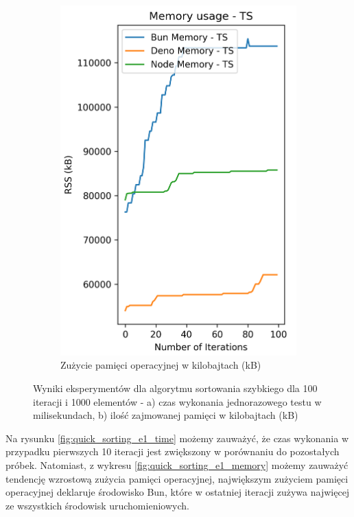 \begin{figure}[H]
\begin{subfigure}[b]{0.44\textwidth}
  \end{subfigure}
  \begin{subfigure}[b]{0.44\textwidth}
    \centering
    \includegraphics[width=\textwidth]{Figures/sorting/sorting_quick_100_1000_ts_memory.png}
    \caption{Zużycie pamięci operacyjnej w kilobajtach (kB)}
    \label{fig:quick_sorting_e1_ts_memory}
  \end{subfigure}
  \caption{Wyniki eksperymentów dla algorytmu sortowania szybkiego dla 100 iteracji i 1000 elementów - a) czas wykonania jednorazowego testu w milisekundach, b) ilość zajmowanej pamięci w kilobajtach (kB)}
  \label{fig:quick_sorting_e1_ts}
\end{figure}

Na rysunku \ref{fig:quick_sorting_e1_time} możemy zauważyć, że czas wykonania w przypadku pierwszych 10 iteracji jest zwiększony w porównaniu do pozostałych próbek. Natomiast, z wykresu \ref{fig:quick_sorting_e1_memory} możemy zauważyć tendencję wzrostową zużycia pamięci operacyjnej, największym zużyciem pamięci operacyjnej deklaruje środowisko Bun, które w ostatniej iteracji zużywa najwięcej ze wszystkich środowisk uruchomieniowych.

